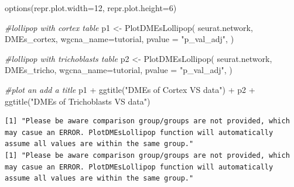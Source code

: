 \documentclass[
  letterpaper,
  DIV=11,
  numbers=noendperiod]{scrartcl}
\newenvironment{Shaded}{\begin{snugshade}}{\end{snugshade}}
\newcommand{\AttributeTok}[1]{\textcolor[rgb]{0.49,0.56,0.16}{#1}}
\newcommand{\CommentTok}[1]{\textcolor[rgb]{0.38,0.63,0.69}{\textit{#1}}}
\newcommand{\DecValTok}[1]{\textcolor[rgb]{0.25,0.63,0.44}{#1}}
\newcommand{\FunctionTok}[1]{\textcolor[rgb]{0.02,0.16,0.49}{#1}}
\newcommand{\NormalTok}[1]{\textcolor[rgb]{0.00,0.44,0.13}{#1}}
\newcommand{\OtherTok}[1]{\textcolor[rgb]{0.00,0.44,0.13}{#1}}
\newcommand{\SpecialCharTok}[1]{\textcolor[rgb]{0.25,0.44,0.63}{#1}}
\newcommand{\StringTok}[1]{\textcolor[rgb]{0.25,0.44,0.63}{#1}}
\begin{document}
\begin{Shaded}
\begin{Highlighting}[]
\FunctionTok{options}\NormalTok{(}\AttributeTok{repr.plot.width=}\DecValTok{12}\NormalTok{, }\AttributeTok{repr.plot.height=}\DecValTok{6}\NormalTok{)}

\CommentTok{\#lollipop with cortex table}
\NormalTok{p1 }\OtherTok{\textless{}{-}} \FunctionTok{PlotDMEsLollipop}\NormalTok{(}
\NormalTok{  seurat.network, }
\NormalTok{  DMEs\_cortex, }
  \AttributeTok{wgcna\_name=}\StringTok{\textquotesingle{}tutorial\textquotesingle{}}\NormalTok{, }
  \AttributeTok{pvalue =} \StringTok{"p\_val\_adj"}\NormalTok{,}
\NormalTok{)}

\CommentTok{\#lollipop with trichoblasts table}
\NormalTok{p2 }\OtherTok{\textless{}{-}} \FunctionTok{PlotDMEsLollipop}\NormalTok{(}
\NormalTok{  seurat.network, }
\NormalTok{  DMEs\_tricho, }
  \AttributeTok{wgcna\_name=}\StringTok{\textquotesingle{}tutorial\textquotesingle{}}\NormalTok{, }
  \AttributeTok{pvalue =} \StringTok{"p\_val\_adj"}\NormalTok{,}
\NormalTok{)}

\CommentTok{\#plot an add a title}
\NormalTok{p1 }\SpecialCharTok{+} \FunctionTok{ggtitle}\NormalTok{(}\StringTok{"DMEs of Cortex VS data"}\NormalTok{) }\SpecialCharTok{+} 
\NormalTok{p2 }\SpecialCharTok{+} \FunctionTok{ggtitle}\NormalTok{(}\StringTok{"DMEs of Trichoblasts VS data"}\NormalTok{)}
\end{Highlighting}
\end{Shaded}

\begin{verbatim}
[1] "Please be aware comparison group/groups are not provided, which may casue an ERROR. PlotDMEsLollipop function will automatically assume all values are within the same group."
[1] "Please be aware comparison group/groups are not provided, which may casue an ERROR. PlotDMEsLollipop function will automatically assume all values are within the same group."
\end{verbatim}
\end{document}
